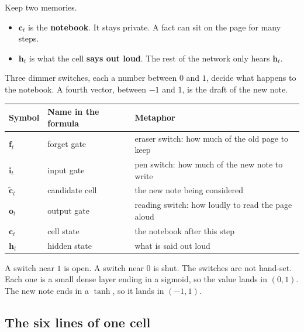 \documentclass[11pt]{article}
\begin{document}
Keep two memories.
\begin{itemize}[leftmargin=*]
  \item \(\mathbf{c}_t\) is the \textbf{notebook}. It stays private. A fact
        can sit on the page for many steps.
  \item \(\mathbf{h}_t\) is what the cell \textbf{says out loud}. The rest
        of the network only hears \(\mathbf{h}_t\).
\end{itemize}
Three dimmer switches, each a number between \(0\) and \(1\), decide what
happens to the notebook. A fourth vector, between \(-1\) and \(1\), is the
draft of the new note.
\begin{center}
\begin{tabular}{@{}lll@{}}
\toprule
Symbol & Name in the formula & Metaphor \\
\midrule
\(\mathbf{f}_t\) & forget gate & eraser switch: how much of the old page to keep \\
\(\mathbf{i}_t\) & input gate & pen switch: how much of the new note to write \\
\(\tilde{\mathbf{c}}_t\) & candidate cell & the new note being considered \\
\(\mathbf{o}_t\) & output gate & reading switch: how loudly to read the page aloud \\
\(\mathbf{c}_t\) & cell state & the notebook after this step \\
\(\mathbf{h}_t\) & hidden state & what is said out loud \\
\bottomrule
\end{tabular}
\end{center}

A switch near \(1\) is open. A switch near \(0\) is shut. The switches are
not hand-set. Each one is a small dense layer ending in a sigmoid, so the
value lands in \((0,1)\). The new note ends in a \(\tanh\), so it lands in
\((-1,1)\).

\subsection{The six lines of one cell}
\end{document}
